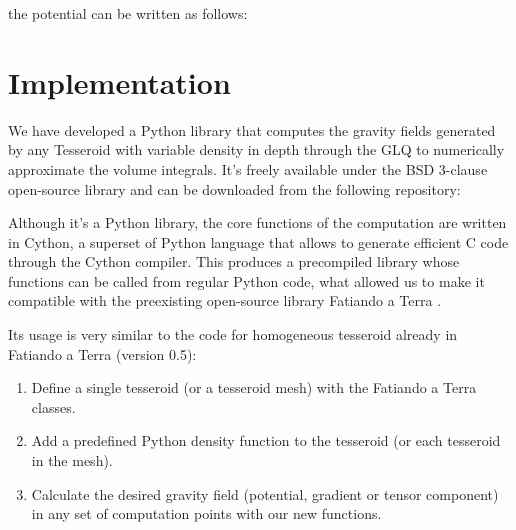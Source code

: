\documentclass[extra]{gji}
\begin{document}
\noindent the potential can be written as follows:



\section{Implementation}

We have developed a Python library that computes the gravity fields generated by any Tesseroid with variable density in depth through the GLQ to numerically approximate the volume integrals.
It's freely available under the BSD 3-clause open-source library and can be downloaded from the following repository: 

Although it's a Python library, the core functions of the computation are written in Cython, a superset of Python language that allows to generate efficient C code through the Cython compiler.
This produces a precompiled library whose functions can be called from regular Python code, what allowed us to make it compatible with the preexisting open-source library Fatiando a Terra \citep{Uieda2013}.

Its usage is very similar to the code for homogeneous tesseroid already in Fatiando a Terra (version 0.5):

\begin{enumerate}
\renewcommand{\theenumi}{(\arabic{enumi})}
    \item Define a single tesseroid (or a tesseroid mesh) with the Fatiando a Terra classes.
    \item Add a predefined Python density function to the tesseroid (or each tesseroid in the mesh).
    \item Calculate the desired gravity field (potential, gradient or tensor component) in any set of computation points with our new functions.
\end{enumerate}
\end{document}
